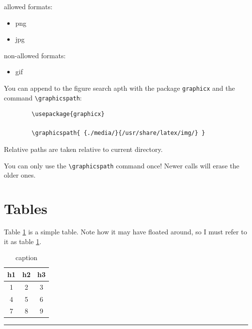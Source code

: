 \documentclass[12pt]{article}
\newcommand{\inOut}[1]{#1}                                %
\begin{document}
    allowed formats:

    \begin{itemize}
        \item png
        \item jpg
    \end{itemize}

    non-allowed formats:

    \begin{itemize}
        \item gif
    \end{itemize}

    You can append to the figure search apth with the package \lstinline|graphicx| and the command \lstinline|\graphicspath|:

    \begin{lstlisting}
        \usepackage{graphicx}

        \graphicspath{ {./media/}{/usr/share/latex/img/} }
    \end{lstlisting}

    Relative paths are taken relative to current directory.

    You can only use the \lstinline|\graphicspath| command once! Newer calls will erase the older ones.

%

\section{Tables}\label{secTab}

    \begin{example} \label{expTab1}
        Table \ref{tab1} is a simple table. Note how it may have floated around, so I must refer to it as table \ref{tab1}.
        \inOut{
            \begin{table}[h]
                \centering
                \begin{tabular}{ccc}
                    h1 & h2 & h3 \\
                    \hline
                    1 & 2 & 3 \\
                    4 & 5 & 6 \\
                    7 & 8 & 9 \\
                \end{tabular}
                \caption{caption}
                \label{tab1}
            \end{table}
        }
    \end{example}\hrule
\end{document}
